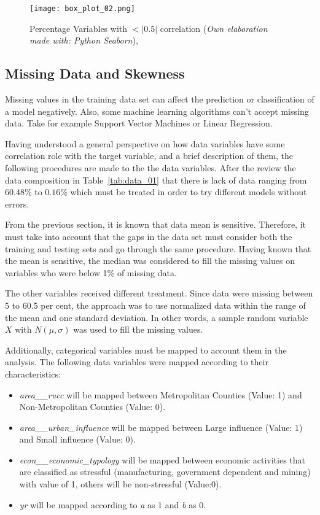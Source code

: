 \documentclass[
10pt, %
a4paper, %
oneside, %
headinclude,footinclude, %
BCOR5mm, %
]{scrartcl}
\begin{document}
\FloatBarrier
\begin{figure}[H]
\centering 
\texttt{[image: box\_plot\_02.png]} 
\caption[Box plot of correlated data variables]{Percentage Variables with $<|0.5|$ correlation (\emph{Own elaboration made with: Python Seaborn}), }
\label{fig:boxplot_02} 
\end{figure}

\subsection{Missing Data and Skewness}

Missing values in the training data set can affect the prediction or classification of a model negatively. Also, some machine learning algorithms can't accept missing data. Take for example Support Vector Machines or Linear Regression.

Having understood a general perspective on how data variables have some correlation role with the target variable, and a brief description of them, the following procedures are made to the the data variables. After the review the data composition in Table~\ref{tab:data_01} that there is lack of data ranging from $60.48\%$ to $0.16\%$ which must be treated in order to try different models without errors.



From the previous section, it is known that data mean is sensitive. Therefore, it must take into account that the gaps in the data set must consider both the training and testing sets and go through the same procedure. Having known that the mean is sensitive, the median was considered to fill the missing values on variables who were below 1\% of missing data.

The other variables received different treatment. Since data were missing between 5 to 60.5 per cent, the approach was to use normalized data within the range of the mean and one standard deviation. In other words, a sample random variable $X$ with $N(\mu,\sigma)$ was used to fill the missing values.

Additionally, categorical variables must be mapped to account them in the analysis. The following data variables were mapped according to their characteristics:

\begin{itemize}
\item \textit{area\_\_rucc} will be mapped between Metropolitan Counties (Value: 1) and Non-Metropolitan Counties (Value: 0).
\item \textit{area\_\_urban\_influence} will be mapped between Large influence (Value: 1) and Small influence (Value: 0).
\item \textit{econ\_\_economic\_typology} will be mapped between economic activities that are classified as stressful (manufacturing, government dependent and mining) with value of 1, others will be non-stressful (Value:0).
\item \textit{yr} will be mapped according to \textit{a} as 1 and \textit{b} as 0.
\end{itemize}
\end{document}

